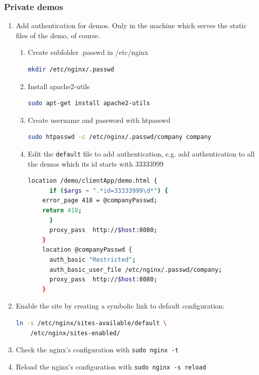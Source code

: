 \documentclass[a4paper,12pt]{article}
\begin{document}
\subsubsection{Private demos}
\begin{enumerate}
    \item Add authentication for demos. Only in the machine which serves the static files of the demo, of course.
    \begin{enumerate}
    \item Create subfolder .passwd in /etc/nginx
    \begin{lstlisting}[language=Bash]
    mkdir /etc/nginx/.passwd
    \end{lstlisting}
    \item Install apache2-utils
    \begin{lstlisting}[language=Bash]
    sudo apt-get install apache2-utils
    \end{lstlisting}
    \item Create username and password with htpasswd
    \begin{lstlisting}[language=Bash]
     sudo htpasswd -c /etc/nginx/.passwd/company company
    \end{lstlisting}
    \item Edit the {\tt default} file to add authentication, e.g. add authentication to all the demos which its id starts with 33333999
    \begin{lstlisting}[language=Bash]
    location /demo/clientApp/demo.html {
      if ($args ~ ".*id=33333999\d*") {
	error_page 418 = @companyPasswd;
	return 418;
      }
      proxy_pass  http://$host:8080;
    }
    location @companyPasswd {
      auth_basic "Restricted";
      auth_basic_user_file /etc/nginx/.passwd/company;
      proxy_pass  http://$host:8080;
    }
    \end{lstlisting}
    \end{enumerate}

    \item Enable the site by creating a symbolic link to default configuration:
    \begin{lstlisting}[language=Bash]
    ln -s /etc/nginx/sites-available/default \
    /etc/nginx/sites-enabled/
    \end{lstlisting}

    \item Check the nginx's configuration with {\tt sudo nginx -t}

    \item Reload the nginx's configuration with {\tt sudo nginx -s reload}
\end{enumerate}
\end{document}
